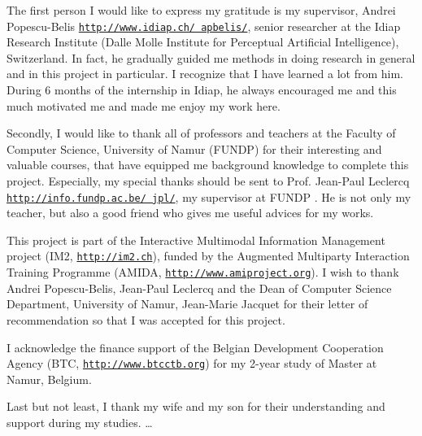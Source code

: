 


The first person I would like to express my gratitude is my supervisor, Andrei Popescu-Belis \href{http://www.idiap.ch/~apbelis/} {\texttt{http://www.idiap.ch/~apbelis/}}, senior researcher at the Idiap Research Institute (Dalle Molle Institute for Perceptual Artificial Intelligence), Switzerland. In fact, he gradually guided me methods in doing research in general and in this project in particular. I recognize that I have learned a lot from him. During 6 months of the internship in Idiap, he always encouraged me and this much motivated me and made me enjoy my work here. 

Secondly, I would like to thank all of professors and teachers at the Faculty of Computer Science, University of Namur (FUNDP) for their interesting and valuable courses, that have equipped me background knowledge to complete this project. Especially, my special thanks should be sent to Prof. Jean-Paul Leclercq \href{http://www.fundp.ac.be/universite/personnes/page_view/01000350/}{\texttt{http://info.fundp.ac.be/~jpl/}}, my supervisor at FUNDP . He is not only my teacher, but also a good friend who gives me useful advices for my works. 

This project is part of the Interactive Multimodal Information Management project (IM2, \href{http://www.im2.ch} {\texttt{http://im2.ch}}), funded by the Augmented Multiparty Interaction Training Programme (AMIDA, \href{http://www.amiproject.org}{\texttt{http://www.amiproject.org}}). I wish to thank Andrei Popescu-Belis, Jean-Paul Leclercq and the Dean of Computer Science Department, University of Namur, Jean-Marie Jacquet for their letter of recommendation so that I was accepted for this project.

I acknowledge the finance support of the Belgian Development Cooperation Agency (BTC, \href{http://www.btcctb.org}{\texttt{http://www.btcctb.org}}) for my 2-year study of Master at Namur, Belgium.

Last but not least, I thank my wife and my son for their understanding and support during my studies. \ldots




